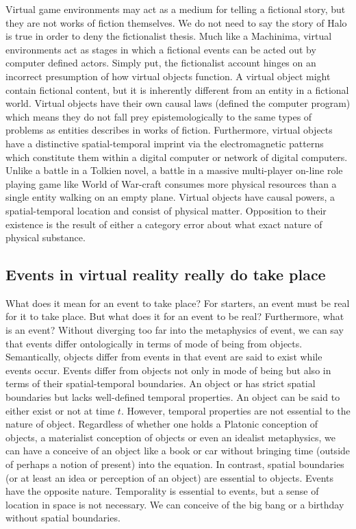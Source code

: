 
 Virtual game environments may act as a medium for telling a fictional story, but they are not works of fiction themselves. We do not need to say the story of Halo is true in order to deny the fictionalist thesis. Much like a Machinima, virtual environments act as stages in which a fictional events can be acted out by computer defined actors. Simply put, the fictionalist account hinges on an incorrect presumption of how virtual objects function. A virtual object might contain fictional content, but it is inherently different from an entity in a fictional world. Virtual objects have their own causal laws (defined the computer program) which means they do not fall prey epistemologically to the same types of problems as entities describes in works of fiction. Furthermore, virtual objects have a distinctive spatial-temporal imprint via the electromagnetic patterns which constitute them within a digital computer or network of digital computers. Unlike a battle in a Tolkien novel, a battle in a massive multi-player on-line role playing game like World of War-craft consumes more physical resources than a single entity walking on an empty plane. Virtual objects have causal powers, a spatial-temporal location and consist of physical matter. Opposition to their existence is the result of either a  category error about what exact nature of physical substance.
\subsection{Events in virtual reality really do take place}
What does it mean for an event to take place? For starters, an event must be real for it to take place. But what does it for an event to be real? Furthermore, what is an event? Without diverging too far into the metaphysics of event, we can say that events differ ontologically in terms of mode of being from objects. Semantically, objects differ from events in that event are said to exist while events occur. \cite{10.2307/4619602}
Events differ from objects not only in mode of being but also in terms of their spatial-temporal boundaries. An object or has strict spatial boundaries but lacks well-defined temporal properties. An object can be said to either exist or not at time $t$. However, temporal properties are not essential to the nature of object. Regardless of whether one holds a Platonic conception of objects, a materialist conception of objects or even an idealist metaphysics, we can have a conceive of an object like a book or car without bringing time (outside of perhaps a notion of present) into the equation. In contrast, spatial boundaries (or at least an idea or perception of an object) are essential to objects. Events have the opposite nature. Temporality is essential to events, but a sense of location in space is not necessary. We can conceive of the big bang or a birthday without spatial boundaries.
\newline



